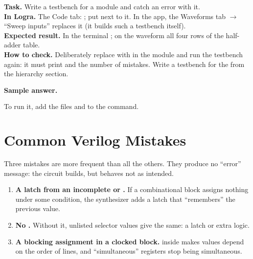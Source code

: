 \begin{diybox}
\textbf{Task.} Write a testbench for a module and catch an error with it.\\
\textbf{In Logra.} The Code tab: ; put
 next to it. In the app, the Waveforms tab $\to$ ``Sweep
inputs'' replaces it (it builds such a testbench itself).\\
\textbf{Expected result.} In the terminal ; on the
waveform all four rows of the half-adder table.\\
\textbf{How to check.} Deliberately replace \code{\^{}} with \code{|} in the
module and run the testbench again: it must print  and the number
of mistakes.
 Write a testbench for the  from the hierarchy section.
\end{diybox}

\textbf{Sample answer.}\par\nopagebreak
{}
To run it, add the files  and  to the command.


\section{Common Verilog Mistakes}
\label{sec:v-pitfalls}

Three mistakes are more frequent than all the others. They produce no
``error'' message: the circuit builds, but behaves not as intended.

\begin{enumerate}
  \item \textbf{A latch from an incomplete  or .} If a
        combinational block assigns nothing under some condition, the synthesizer
        adds a latch that ``remembers'' the previous value.
  \item \textbf{No .} Without it, unlisted selector values give
        the same: a latch or extra logic.
  \item \textbf{A blocking assignment in a clocked block.} \code{=} inside
         makes values depend on the order of lines,
        and ``simultaneous'' registers stop being simultaneous.
\end{enumerate}

